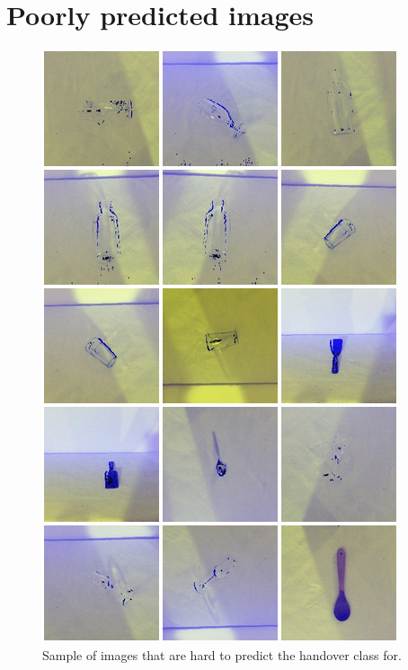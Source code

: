 \chapter{Poorly predicted images}
\label{app:bad_images}
\begin{figure}
	\centering
	\includegraphics[width=\textwidth]{img/results/bad-images.jpg}
	\caption{Sample of images that are hard to predict the handover class for.}
	\label{fig:app_bad_images}
\end{figure}

